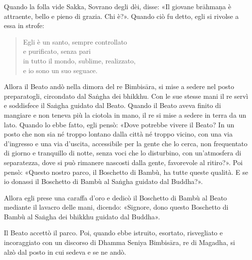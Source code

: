 Quando la folla vide Sakka, Sovrano degli dèi, disse: «Il giovane brāhmaṇa è
attraente, bello e pieno di grazia. Chi è?». Quando ciò fu detto, egli si
rivolse a essa in strofe:

\begin{quote}
Egli è un santo, sempre controllato \\
e purificato, senza pari \\
in tutto il mondo, sublime, realizzato, \\
e io sono un suo seguace.
\end{quote}

Allora il Beato andò nella dimora del re Bimbisāra, si mise a sedere nel posto
preparatogli, circondato dal Saṅgha dei bhikkhu. Con le sue stesse mani il re
servì e soddisfece il Saṅgha guidato dal Beato. Quando il Beato aveva finito di
mangiare e non teneva più la ciotola in mano, il re si mise a sedere in terra da
un lato. Quando lo ebbe fatto, egli pensò: «Dove potrebbe vivere il Beato? In un
posto che non sia né troppo lontano dalla città né troppo vicino, con una via
d’ingresso e una via d’uscita, accessibile per la gente che lo cerca, non
frequentato di giorno e tranquillo di notte, senza voci che lo disturbino, con
un’atmosfera di separatezza, dove si può rimanere nascosti dalla gente,
favorevole al ritiro?». Poi pensò: «Questo nostro parco, il Boschetto di Bambù,
ha tutte queste qualità. E se io donassi il Boschetto di Bambù al Saṅgha guidato
dal Buddha?».

Allora egli prese una caraffa d’oro e dedicò il Boschetto di Bambù al Beato
mediante il lavacro delle mani, dicendo: «Signore, dono questo Boschetto di
Bambù al Saṅgha dei bhikkhu guidato dal Buddha».

Il Beato accettò il parco. Poi, quando ebbe istruito, esortato, risvegliato e
incoraggiato con un discorso di Dhamma Seniya Bimbisāra, re di Magadha, si alzò
dal posto in cui sedeva e se ne andò.


